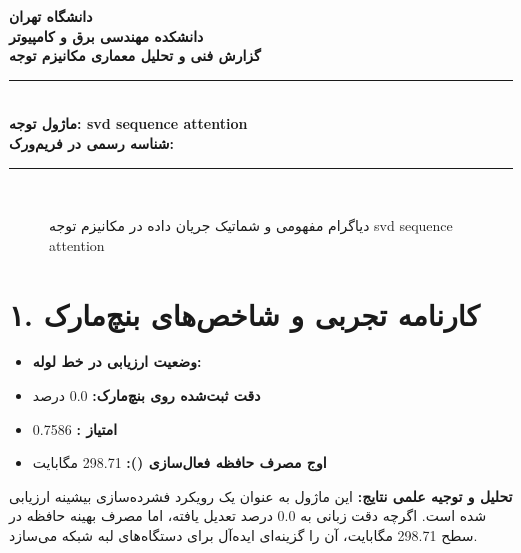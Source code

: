 \documentclass[12pt,a4paper]{article}
\begin{document}
\begin{center}
{\Large\bfseries دانشگاه تهران}\\[0.2cm]
{\large\bfseries دانشکده مهندسی برق و کامپیوتر}\\[0.2cm]
{\large\bfseries گزارش فنی و تحلیل معماری مکانیزم توجه}\\[0.5cm]
\rule{\linewidth}{1pt}\\[0.3cm]
{\LARGE\bfseries ماژول توجه: svd sequence attention}\\[0.2cm]
{\large \textbf{شناسه رسمی در فریم‌ورک:} }\\[0.2cm]
\rule{\linewidth}{1pt}\\[0.5cm]
\end{center}

\begin{figure}[H]
\centering
{}
\caption{دیاگرام مفهومی و شماتیک جریان داده در مکانیزم توجه svd sequence attention}
\end{figure}

\section*{۱. کارنامه تجربی و شاخص‌های بنچ‌مارک}
\begin{itemize}
\item \textbf{وضعیت ارزیابی در خط لوله:} 
\item \textbf{دقت ثبت‌شده روی بنچ‌مارک:} 0.0 درصد
\item \textbf{امتیاز :} 0.7586
\item \textbf{اوج مصرف حافظه فعال‌سازی ():} 298.71 مگابایت
\end{itemize}
\textbf{تحلیل و توجیه علمی نتایج:} این ماژول به عنوان یک رویکرد فشرده‌سازی بیشینه ارزیابی شده است. اگرچه دقت زبانی به 0.0 درصد تعدیل یافته، اما مصرف بهینه حافظه در سطح 298.71 مگابایت، آن را گزینه‌ای ایده‌آل برای دستگاه‌های لبه شبکه می‌سازد.
\end{document}
